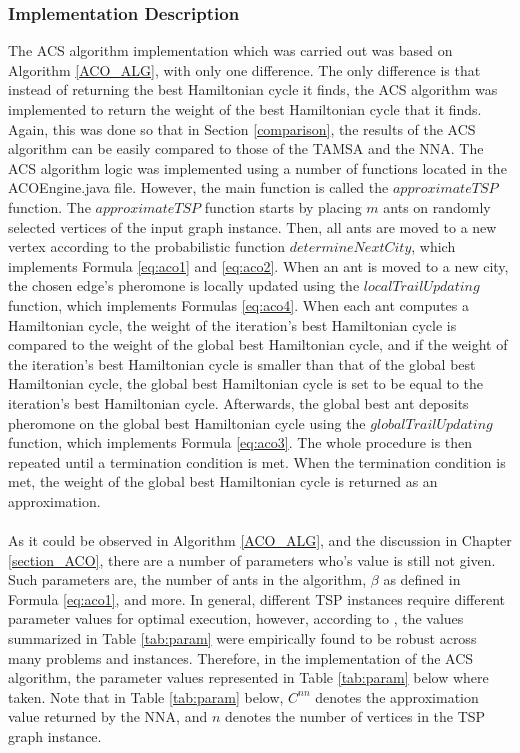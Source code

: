 \documentclass[12pt]{article}
\numberwithin{equation}{subsection}
\numberwithin{table}{subsection}
\numberwithin{algorithm}{subsection}
\numberwithin{figure}{subsection}
\begin{document}
\subsubsection{Implementation Description}
\label{acs_impl}
The ACS algorithm implementation which was carried out was based on Algorithm \ref{ACO_ALG}, with only one difference. The only difference is that instead of returning the best Hamiltonian cycle it finds, the ACS algorithm was implemented to return the weight of the best Hamiltonian cycle that it finds. Again, this was done so that in Section \ref{comparison}, the results of the ACS algorithm can be easily compared to those of the TAMSA and the NNA. The ACS algorithm logic was implemented using a number of functions located in the ACOEngine.java file. However, the main function is called the $approximateTSP$ function. The $approximateTSP$ function starts by placing $m$ ants on randomly selected vertices of the input graph instance. Then, all ants are moved to a new vertex according to the probabilistic function $determineNextCity$, which implements Formula \ref{eq:aco1} and \ref{eq:aco2}. When an ant is moved to a new city, the chosen edge's pheromone is locally updated using the $localTrailUpdating$ function, which implements Formulas \ref{eq:aco4}. When each ant computes a Hamiltonian cycle, the weight of the iteration's best Hamiltonian cycle is compared to the weight of the global best Hamiltonian cycle, and if the weight of the iteration's best Hamiltonian cycle is smaller than that of the global best Hamiltonian cycle, the global best Hamiltonian cycle is set to be equal to the iteration's best Hamiltonian cycle. Afterwards, the global best ant deposits pheromone on the global best Hamiltonian cycle using the $globalTrailUpdating$ function, which implements Formula \ref{eq:aco3}. The whole procedure is then repeated until a termination condition is met. When the termination condition is met, the weight of the global best Hamiltonian cycle is returned as an approximation.\\\\
As it could be observed in Algorithm \ref{ACO_ALG}, and the discussion in Chapter \ref{section_ACO}, there are a number of parameters who's value is still not given. Such parameters are, the number of ants in the algorithm, $\beta$ as defined in Formula \ref{eq:aco1}, and more. In general, different TSP instances require different parameter values for optimal execution, however, according to \cite{dorigo_stutzle_thomas_2004}, the values summarized in Table \ref{tab:param} were empirically found to be robust across many problems and instances. Therefore, in the implementation of the ACS algorithm, the parameter values represented in Table \ref{tab:param} below where taken. Note that in Table \ref{tab:param} below, $C^{nn}$ denotes the approximation value returned by the NNA, and $n$ denotes the number of vertices in the TSP graph instance.
\end{document}
